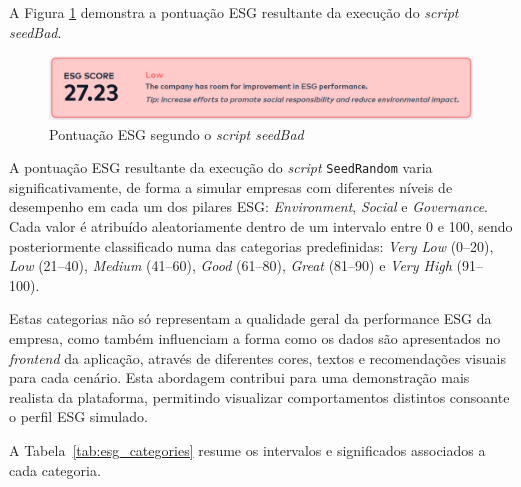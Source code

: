 A Figura \ref{fig:bad_esg} demonstra a pontuação ESG resultante da execução do \textit{script seedBad}.

\begin{figure}[H]
    \centering
    \includegraphics[width=\linewidth,keepaspectratio]{frontmatter/assets/platform_prints/seeding/bad_esg.png}
    \caption{Pontuação ESG segundo o \textit{script seedBad}}
    \label{fig:bad_esg}
\end{figure}

A pontuação ESG resultante da execução do \textit{script} \texttt{SeedRandom} varia significativamente, de forma a simular empresas com diferentes níveis de desempenho em cada um dos pilares ESG: \textit{Environment}, \textit{Social} e \textit{Governance}. Cada valor é atribuído aleatoriamente dentro de um intervalo entre 0 e 100, sendo posteriormente classificado numa das categorias predefinidas: \textit{Very Low} (0--20), \textit{Low} (21--40), \textit{Medium} (41--60), \textit{Good} (61--80), \textit{Great} (81--90) e \textit{Very High} (91--100).

Estas categorias não só representam a qualidade geral da performance ESG da empresa, como também influenciam a forma como os dados são apresentados no \textit{frontend} da aplicação, através de diferentes cores, textos e recomendações visuais para cada cenário. Esta abordagem contribui para uma demonstração mais realista da plataforma, permitindo visualizar comportamentos distintos consoante o perfil ESG simulado.

A Tabela~\ref{tab:esg_categories} resume os intervalos e significados associados a cada categoria.

